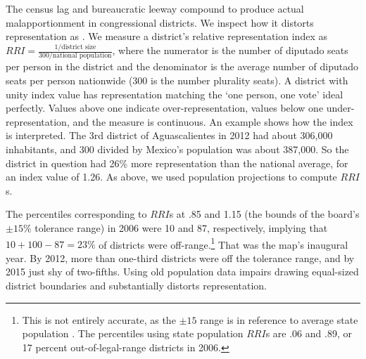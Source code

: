 \documentclass[letter,12pt]{article}
\begin{document}
The census lag and bureaucratic leeway compound to produce actual malapportionment in congressional districts. We inspect how it distorts representation as \citet{ansolabehere.gerber.snyderCourtRedis2002}. We measure a district's relative representation index as $RRI = \frac{1/\text{district size}}{300/\text{national population}}$, where the numerator is the number of diputado seats per person in the district and the denominator is the average number of diputado seats per person nationwide (300 is the number plurality seats). A district with unity index value has representation matching the `one person, one vote' ideal perfectly. Values above one indicate over-representation, values below one under-representation, and the measure is continuous. An example shows how the index is interpreted. The 3rd district of Aguascalientes in 2012 had about 306,000 inhabitants, and 300 divided by Mexico's population was about 387,000. So the district in question had 26\% more representation than the national average, for an index value of 1.26. As above, we used population projections to compute $RRI$s.

The percentiles corresponding to $RRI$s at .85 and 1.15 (the bounds of the board's $\pm15\%$ tolerance range) in 2006 were 10 and 87, respectively, implying that $10+100-87=23\%$ of districts were off-range.\footnote{This is not entirely accurate, as the $\pm15$ range is in reference to average state population \citep[not average national population, analyzed here, see][]{altman.magar.mcd.trelles2014apsa}. The percentiles using state population $RRI$s are .06 and .89, or 17 percent out-of-legal-range districts in 2006.} That was the map's inaugural year. By 2012, more than one-third districts were off the tolerance range, and by 2015 just shy of two-fifths. Using old population data impairs drawing equal-sized district boundaries and substantially distorts representation. 
\end{document}

